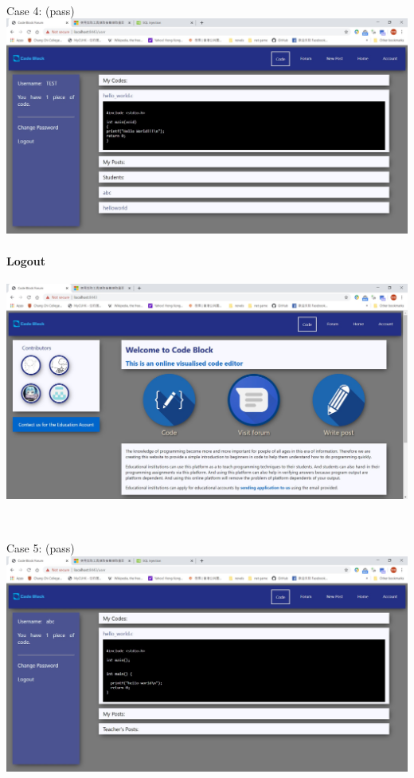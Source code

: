~

Case 4: (pass)\\
\includegraphics[scale=0.45]{Doc/Pics/case-5-2-4}

\paragraph{Logout}

\includegraphics[scale=0.45]{Doc/Pics/logout}

~

Case 5: (pass)\\
\includegraphics[scale=0.45]{Doc/Pics/case-5-2-5}

